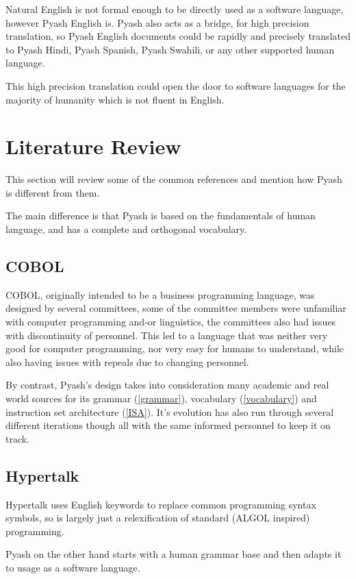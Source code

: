 Natural English is not formal enough to be directly used as a software
language, however Pyash English is.  Pyash also acts as a bridge, for 
high precision translation, so Pyash English documents could be rapidly and 
precisely translated to Pyash Hindi, Pyash Spanish, Pyash Swahili, or any 
other supported human language. 

This high precision translation could open the door to software languages for 
the majority of humanity which is not fluent in English. 

\section{Literature Review}
This section will review some of the common
references and mention how Pyash is different from them. 

The main difference is that Pyash is based on the fundamentals of human
language, and has a complete and orthogonal vocabulary.

\subsection{COBOL}
COBOL, originally intended to be a business programming language, 
was designed by several committees, some of the committee members were
unfamiliar with computer programming and-or linguistics, the committees also had
 issues with discontinuity of personnel. This led to a language that was neither
 very good for computer programming, nor very easy for humans to understand,
 while also having issues with repeals due to changing personnel. 

By contrast, Pyash's design takes into consideration many academic and real world sources for
its grammar (\ref{grammar}), vocabulary (\ref{vocabulary}) and instruction set
architecture (\ref{ISA}). It's evolution has also run through several different
iterations though all with the same informed personnel to keep it on track. 

\subsection{Hypertalk}
Hypertalk uses English keywords to replace common programming syntax symbols,
so is largely just a relexification of standard (ALGOL inspired) programming. 

Pyash on the other hand starts with a human grammar base and then adapts it to
usage as a software language. 

